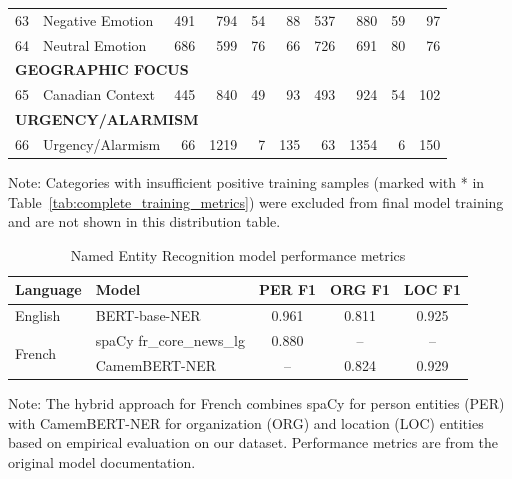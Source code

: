 {\begin{longtable}{p{0.5cm}p{5.5cm}rrrrrrrr}
63 & Negative Emotion & 491 & 794 & 54 & 88 & 537 & 880 & 59 & 97 \\
64 & Neutral Emotion & 686 & 599 & 76 & 66 & 726 & 691 & 80 & 76 \\
\multicolumn{10}{l}{\cellcolor{gray!10}\textbf{GEOGRAPHIC FOCUS}} \\
\midrule
65 & Canadian Context & 445 & 840 & 49 & 93 & 493 & 924 & 54 & 102 \\
\multicolumn{10}{l}{\cellcolor{gray!10}\textbf{URGENCY/ALARMISM}} \\
\midrule
66 & Urgency/Alarmism & 66 & 1219 & 7 & 135 & 63 & 1354 & 6 & 150 \\
\bottomrule
\end{longtable}
\vspace{0.5em}
\noindent\footnotesize
Note: Categories with insufficient positive training samples (marked with * in Table~\ref{tab:complete_training_metrics}) were excluded from final model training and are not shown in this distribution table.
} %
\begin{table}[h!]
\setcounter{table}{3}
\renewcommand{\thetable}{B4}
\centering
\caption{Named Entity Recognition model performance metrics}
\label{tab:ner_performance}
\small
\begin{tabular}{llccc}
\toprule
\textbf{Language} & \textbf{Model} & \textbf{PER F1} & \textbf{ORG F1} & \textbf{LOC F1} \\
\midrule
English & BERT-base-NER & 0.961 & 0.811 & 0.925 \\
\midrule
\multirow{2}{*}{French} & spaCy fr\_core\_news\_lg & 0.880 & -- & -- \\
& CamemBERT-NER & -- & 0.824 & 0.929 \\
\bottomrule
\end{tabular}

\vspace{0.5em}
\noindent\footnotesize
Note: The hybrid approach for French combines spaCy for person entities (PER) with CamemBERT-NER for organization (ORG) and location (LOC) entities based on empirical evaluation on our dataset. Performance metrics are from the original model documentation.
\end{table}
\landscape

